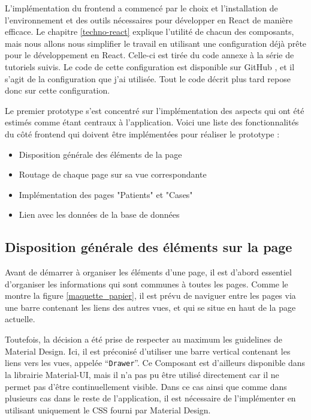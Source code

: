 	L'implémentation du frontend a commencé par le choix et l'installation de l'environnement et des outils nécessaires pour développer en React de manière efficace. Le chapitre \ref{techno-react} explique l'utilité de chacun des composants, mais nous allons nous simplifier le travail en utilisant une configuration déjà prête pour le développement en React. Celle-ci est tirée du code annexe à la série de tutoriels suivis. Le code de cette configuration est disponible sur GitHub \cite{react-boilerplate}, et il s'agit de la configuration que j'ai utilisée. Tout le code décrit plus tard repose donc sur cette configuration.

	Le premier prototype s'est concentré sur l'implémentation des aspects qui ont été estimés comme étant centraux à l'application. Voici une liste des fonctionnalités du côté frontend qui doivent être implémentées pour réaliser le prototype :

	\begin{itemize}
		\item Disposition générale des éléments de la page
		\item Routage de chaque page sur sa vue correspondante
		\item Implémentation des pages "Patients" et "Cases"
		\item Lien avec les données de la base de données
	\end{itemize}

	\subsection{Disposition générale des éléments sur la page}

		Avant de démarrer à organiser les éléments d'une page, il est d'abord essentiel d'organiser les informations qui sont communes à toutes les pages. Comme le montre la figure \ref{maquette_papier}, il est prévu de naviguer entre les pages via une barre contenant les liens des autres vues, et qui se situe en haut de la page actuelle. 

		Toutefois, la décision a été prise de respecter au maximum les guidelines de Material Design\cite{material-design-guidelines}. Ici, il est préconisé d'utiliser une barre vertical contenant les liens vers les vues, appelée ``\texttt{Drawer}''. Ce Composant est d'ailleurs disponible dans la librairie Material-UI, mais il n'a pas pu être utilisé directement car il ne permet pas d'être continuellement visible. Dans ce cas ainsi que comme dans plusieurs cas dans le reste de l'application, il est nécessaire de l'implémenter en utilisant uniquement le CSS fourni par Material Design.

